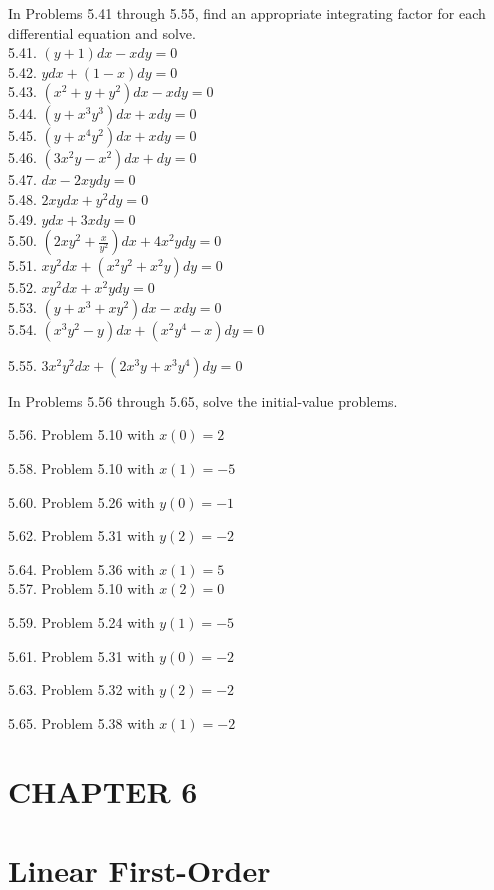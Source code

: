 \documentclass[10pt]{article}
\begin{document}
In Problems 5.41 through 5.55, find an appropriate integrating factor for each differential equation and solve.\\
5.41. $(y+1) d x-x d y=0$\\
5.42. $y d x+(1-x) d y=0$\\
5.43. $\left(x^{2}+y+y^{2}\right) d x-x d y=0$\\
5.44. $\left(y+x^{3} y^{3}\right) d x+x d y=0$\\
5.45. $\left(y+x^{4} y^{2}\right) d x+x d y=0$\\
5.46. $\left(3 x^{2} y-x^{2}\right) d x+d y=0$\\
5.47. $d x-2 x y d y=0$\\
5.48. $2 x y d x+y^{2} d y=0$\\
5.49. $y d x+3 x d y=0$\\
5.50. $\left(2 x y^{2}+\frac{x}{y^{2}}\right) d x+4 x^{2} y d y=0$\\
5.51. $x y^{2} d x+\left(x^{2} y^{2}+x^{2} y\right) d y=0$\\
5.52. $x y^{2} d x+x^{2} y d y=0$\\
5.53. $\left(y+x^{3}+x y^{2}\right) d x-x d y=0$\\
5.54. $\left(x^{3} y^{2}-y\right) d x+\left(x^{2} y^{4}-x\right) d y=0$

5.55. $3 x^{2} y^{2} d x+\left(2 x^{3} y+x^{3} y^{4}\right) d y=0$

In Problems 5.56 through 5.65, solve the initial-value problems.

5.56. Problem 5.10 with $x(0)=2$

5.58. Problem 5.10 with $x(1)=-5$

5.60. Problem 5.26 with $y(0)=-1$

5.62. Problem 5.31 with $y(2)=-2$

5.64. Problem 5.36 with $x(1)=5$\\
5.57. Problem 5.10 with $x(2)=0$

5.59. Problem 5.24 with $y(1)=-5$

5.61. Problem 5.31 with $y(0)=-2$

5.63. Problem 5.32 with $y(2)=-2$

5.65. Problem 5.38 with $x(1)=-2$

\section*{CHAPTER 6}
\section*{Linear First-Order}
\end{document}
